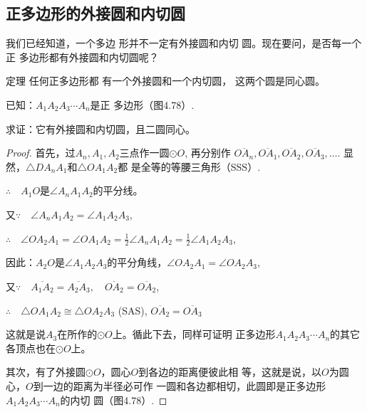 \subsection{正多边形的外接圆和内切圆}
我们已经知道，一个多边
形并不一定有外接圆和内切
圆。现在要问，是否每一个正
多边形都有外接圆和内切圆呢？

\begin{blk}
  {定理} 任何正多边形都
有一个外接圆和一个内切圆，
这两个圆是同心圆。
\end{blk}

已知：$A_1A_2A_3\cdots A_n$是正
多边形（图4.78）.

求证：它有外接圆和内切圆，且二圆同心。

\begin{figure}[htp]
  \centering
  \caption{}
\end{figure}


\begin{proof}
首先，过$A_n,A_1,A_2$三点作一圆$\odot O$, 再分别作
$\overline{OA_n},\overline{OA_1},\overline{OA_2},\overline{OA_3},\ldots$. 显然，$\triangle DA_nA_1$和$\triangle OA_1A_2$都
是全等的等腰三角形（SSS）.

$\therefore\quad A_1O$是$\angle A_nA_1A_2$的平分线。

又$\because\quad \angle A_nA_1A_2=\angle A_1A_2A_3$,

$\therefore\quad \angle OA_2A_1=\angle OA_1A_2=\frac{1}{2}\angle A_nA_1A_2=\frac{1}{2}\angle A_1A_2A_3$,

因此：$A_2O$是$\angle A_1A_2A_3$的平分角线，$\angle OA_2A_1=\angle OA_2A_3$,

又$\because\quad \overline{A_1A_2}=\overline{A_2A_3},\quad \overline{OA_2}=\overline{OA_2}$,

$\therefore\quad \triangle OA_1A_2\cong \triangle OA_2A_3$ (SAS), $\overline{OA_2}=\overline{OA_3}$

这就是说$A_3$在所作的$\odot O$上。循此下去，同样可证明
正多边形$A_1A_2A_3\cdots A_n$的其它各顶点也在$\odot O$上。

其次，有了外接圆$\odot O$，圆心$O$到各边的距离便彼此相
等，这就是说，以$O$为圆心，$O$到一边的距离为半径必可作
一圆和各边都相切，此圆即是正多边形$A_1A_2A_3\cdots A_n$的内切
圆（图4.78）.
\end{proof}


